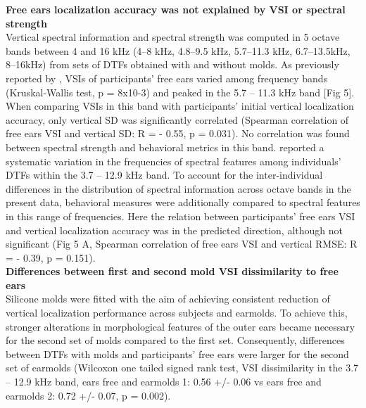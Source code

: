 \begin{multicols}{2}
 \noindent\newpage\textbf{Free ears localization accuracy was not explained by VSI or spectral strength}\\
Vertical spectral information and spectral strength was computed in 5 octave bands between 4 and 16 kHz (4–8 kHz, 4.8–9.5 kHz, 5.7–11.3 kHz, 6.7–13.5kHz, 8–16kHz) from sets of DTFs obtained with and without molds. As previously reported by \citet{trapeau_fast_2016}, VSIs of participants’ free ears varied among frequency bands (Kruskal-Wallis test, p = 8x10-3) and peaked in the 5.7 – 11.3 kHz band [Fig 5]. When comparing VSIs in this band with participants’ initial vertical localization accuracy, only vertical SD was significantly correlated (Spearman correlation of free ears VSI and vertical SD: R = - 0.55, p = 0.031). No correlation was found between spectral strength and behavioral metrics in this band. \citet{middlebrooks_individual_1999} reported a systematic variation in the frequencies of spectral features among individuals’ DTFs within the 3.7 – 12.9 kHz band. To account for the inter-individual differences in the distribution of spectral information across octave bands in the present data, behavioral measures were additionally compared to spectral features in this range of frequencies. Here the relation between participants’ free ears VSI and vertical localization accuracy was in the predicted direction, although not significant (Fig 5 A, Spearman correlation of free ears VSI and vertical RMSE: R = - 0.39, p = 0.151).\\

\noindent\textbf{Differences between first and second mold VSI dissimilarity to free ears}\\
Silicone molds were fitted with the aim of achieving consistent reduction of vertical localization performance across subjects and earmolds. To achieve this, stronger alterations in morphological features of the outer ears became necessary for the second set of molds compared to the first set. Consequently, differences between DTFs with molds and participants’ free ears were larger for the second set of earmolds (Wilcoxon one tailed signed rank test, VSI dissimilarity in the 3.7 – 12.9 kHz band, ears free and earmolds 1:  0.56 +/- 0.06 vs ears free and earmolds 2: 0.72 +/- 0.07, p = 0.002).\\


\end{multicols}
